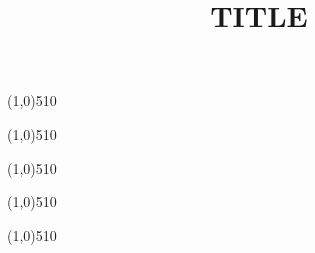 \documentclass{paper}
\title{TITLE}
\begin{document}
\maketitle
\begin{large}\textbf{}\end{large}

\line(1,0){510}

\begin{large}\textbf{}\end{large}

\line(1,0){510}

\begin{large}\textbf{}\end{large}

\line(1,0){510}

\begin{large}\textbf{}\end{large}

\line(1,0){510}

\begin{large}\textbf{}\end{large}

\line(1,0){510}
\end{document}
